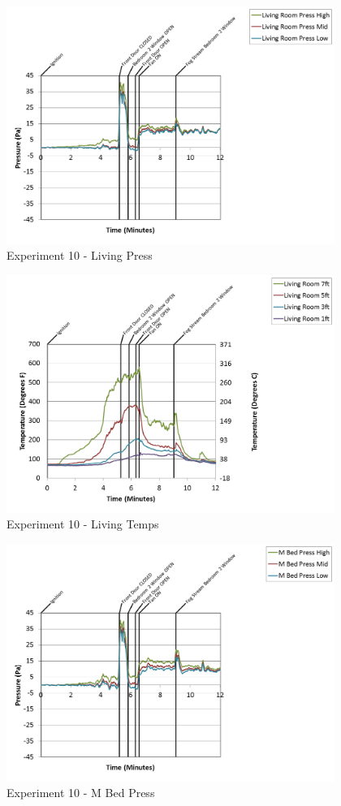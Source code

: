 \documentclass{article}
\begin{document}
\begin{appendices}
\clearpage

\begin{figure}[h!]
	\centering
	\includegraphics[height=3.05in]{0_Images/Results_Charts/Exp_10_Charts/LivingPress.png}
	\caption{Experiment 10 - Living Press}
\end{figure}


\begin{figure}[h!]
	\centering
	\includegraphics[height=3.05in]{0_Images/Results_Charts/Exp_10_Charts/LivingTemps.png}
	\caption{Experiment 10 - Living Temps}
\end{figure}

\clearpage

\begin{figure}[h!]
	\centering
	\includegraphics[height=3.05in]{0_Images/Results_Charts/Exp_10_Charts/MBedPress.png}
	\caption{Experiment 10 - M Bed Press}
\end{figure}



\end{appendices}
\end{document}
